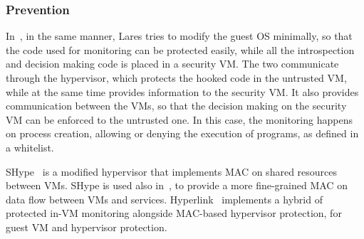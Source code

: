 \subsubsection{Prevention}

In~\cite{payne2008lares}, in the same manner, Lares tries to modify the guest \ac{OS} minimally, so that the code used for monitoring can be protected easily, while all the introspection and decision making code is placed in a security \ac{VM}. The two communicate through the hypervisor, which protects the hooked code in the untrusted \ac{VM}, while at the same time provides information to the security \ac{VM}. It also provides communication between the \ac{VM}s, so that the decision making on the security \ac{VM} can be enforced to the untrusted one. In this case, the monitoring happens on process creation, allowing or denying the execution of programs, as defined in a whitelist.

\par SHype~\cite{sailer2005building} is a modified hypervisor that implements \ac{MAC} on shared resources between \ac{VM}s. SHype is used also in~\cite{hay2008forensics}, to provide a more fine-grained \ac{MAC} on data flow between \ac{VM}s and services. Hyperlink~\cite{xiao2016hyperlink} implements a hybrid of protected in-\ac{VM} monitoring alongside \ac{MAC}-based hypervisor protection, for guest \ac{VM} and hypervisor protection.

